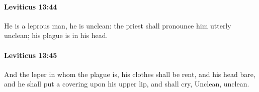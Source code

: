 		\paragraph{Leviticus 13:44} %
			\label{LEVITICUS-13-44}

			He is a leprous man, he is unclean: the priest shall pronounce him utterly unclean; his plague is in his head.


		\paragraph{Leviticus 13:45} %
			\label{LEVITICUS-13-45}

			And the leper in whom the plague is, his clothes shall be rent, and his head bare, and he shall put a covering upon his upper lip, and shall cry, Unclean, unclean.


